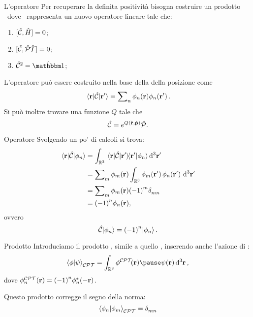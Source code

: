\begin{frame}{L'operatore \hC}
    Per recuperare la definita positività bisogna costruire un prodotto \CPT\ dove \hC\ rappresenta un nuovo operatore lineare tale che:
    \begin{enumerate}[label=\mybullet]
        \pause
        \item $\comm*{\hC}{\hH}\! = 0$;
        \pause
        \item $\comm*{\hC}{\hPT}\! = 0$;
        \pause
        \item $\hC^2 = \hidM$;
    \end{enumerate}
    \pause
    L'operatore può essere costruito nella base della della posizione come
    \begin{equation*}
        \mel*{\vb{r}}{\hC}{\vb{r'}} = \sum\nolimits_n \phi_n\pqty{\vb{r}}\phi_n\pqty*{\vb{r}'}
        \myperiod
    \end{equation*}
    \pause
    Si può inoltre trovare una funzione $Q$ tale che
    \begin{equation*}
        \hC = \myexp{Q\pqty{\hvr,\hvp}}\hP
        \myperiod
    \end{equation*}
\end{frame}

\begin{frame}{Operatore \hC}
    Svolgendo un po' di calcoli si trova:
    \begin{align*}
        \mel{\vb{r}}{\hC}{\phi_n}
        &= \int\nolimits_{\bbR^3} \mel*{\vb{r}}{\hC}{\vb{r'}}\!\!\!\braket*{\vb{r}'}{\phi_n} \dd[3]{\vb{r}'} \\
        &= \sum\nolimits_m \phi_m\pqty{\vb{r}} \int\nolimits_{\bbR^3} \phi_m\pqty*{\vb{r}'} \phi_n\pqty*{\vb{r}'} \dd[3]{\vb{r}'} \\
        &= \sum\nolimits_m \phi_m\pqty{\vb{r}} \pqty{-1}^m \tensor{\delta}{_m_n} \\
        &= \pqty{-1}^n \phi_n\pqty{\vb{r}}\mycomma
    \end{align*}
    ovvero
    \begin{equation*}
        \hC\!\ket{\phi_n} = \pqty{-1}^n\!\ket{\phi_n}
        \myperiod
    \end{equation*}
\end{frame}

\begin{frame}{Prodotto \CPT}
    Introduciamo il prodotto \CPT, simile a quello \PT, inserendo anche l'azione di \hC :
    \begin{equation*}
        \braket{\phi}{\psi}_{\CPT} = \int\nolimits_{\bbR^3} \phi^{\CPT}\!\pqty{\vb{r}}\pause\psi\pqty{\vb{r}} \dd[3]{\vb{r}}
        \mycomma
    \end{equation*}
    dove $\phi^{\CPT}_n\pqty{\vb{r}} = \pqty{-1}^n\phi^*_n\pqty{-\vb{r}}$.

    \pause
    Questo prodotto corregge il segno della norma:
    \begin{equation*}
        \braket{\phi_n}{\phi_m}_{\CPT} = \tensor{\delta}{_m_n}
    \end{equation*}
\end{frame}
